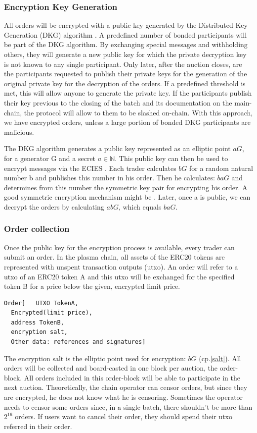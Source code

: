 \documentclass[11pt,parskip=full]{scrartcl}%
\newcommand*{\erc}{ERC20 }
\begin{document}
\subsubsection{Encryption Key Generation}
All orders will be encrypted with a public key generated by the Distributed Key Generation (DKG) algorithm \cite{DKG}. 
A predefined number of bonded participants will be part of the DKG algorithm. 
By exchanging special messages and withholding others, they will generate a new public key for which the private decryption key is not known to any single participant. 
Only later, after the auction closes, are the participants requested to publish their private keys for the generation of the original private key for the decryption of the orders. 
If a predefined threshold is met, this will allow anyone to generate the private key. 
If the participants publish their key previous to the closing of the batch and its documentation on the main-chain, the protocol will allow to them to be slashed on-chain. 
With this approach, we have encrypted orders, unless a large portion of bonded DKG participants are malicious. 

The DKG algorithm generates a public key represented as an elliptic point $aG\label{public key}$, for a generator G and a secret $a\in \mathbb{N}$. 
This public key can then be used to encrypt messages via the ECIES \cite{ECIES}. 
Each trader calculates $bG \label{salt}$ for a random natural number b and publishes this number in his order. 
Then he calculates: $baG$ and determines from this number the symmetric key pair for encrypting his order. 
A good symmetric encryption mechanism might be \cite{cipher}.
Later, once a is public, we can decrypt the orders by calculating $abG$, which equals $baG$. 


\subsubsection{Order collection}
\label{orderblock}
Once the public key for the encryption process is available, every trader can submit an order. 
In the plasma chain, all assets of the ERC20 tokens are represented with unspent transaction outputs (utxo). 
An order will refer to a utxo of an \erc token A and this utxo will be exchanged for the specified token B for a price below the given, encrypted limit price. 
\begin{lstlisting}
Order[   UTXO TokenA,
  Encrypted(limit price),
  address TokenB,
  encryption salt,
  Other data: references and signatures]
\end{lstlisting} 
The encryption salt is the elliptic point used for encryption:  $bG$ (cp.\ref{salt}). 
All orders will be collected and board-casted in one block per auction, the order-block. 
All orders included in this order-block will be able to participate in the next auction. 
Theoretically, the chain operator can censor orders, but since they are encrypted, he does not know what he is censoring. 
Sometimes the operator needs to censor some orders since, in a single batch, there shouldn't be more than $2^{16}$ orders. 
If users want to cancel their order, they should spend their utxo referred in their order. 
\end{document}
